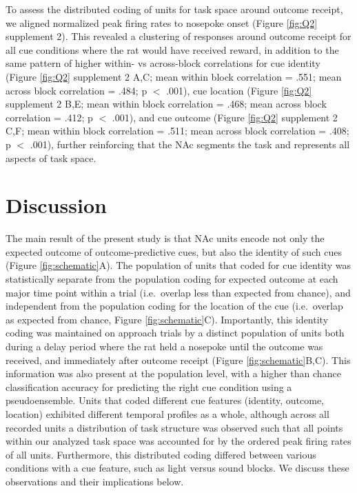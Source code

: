 \documentclass[11pt]{article}
\begin{document}
To assess the distributed coding of units for task space around outcome receipt, we aligned normalized peak firing rates to nosepoke onset (Figure \ref{fig:Q2} supplement 2). This revealed a clustering of responses around outcome receipt for all cue conditions where the rat would have received reward, in addition to the same pattern of higher within- vs across-block correlations for cue identity (Figure \ref{fig:Q2} supplement 2 A,C; mean within block correlation = .551; mean across block correlation = .484; p $<$ .001), cue location (Figure \ref{fig:Q2} supplement 2 B,E; mean within block correlation = .468; mean across block correlation = .412; p $<$ .001), and cue outcome (Figure \ref{fig:Q2} supplement 2 C,F; mean within block correlation = .511; mean across block correlation = .408; p $<$ .001), further reinforcing that the NAc segments the task and represents all aspects of task space.

\section*{Discussion}

The main result of the present study is that NAc units encode not only the expected outcome of outcome-predictive cues, but also the identity of such cues (Figure \ref{fig:schematic}A). The population of units that coded for cue identity was statistically separate from the population coding for expected outcome at each major time point within a trial (i.e.\ overlap less than expected from chance), and independent from the population coding for the location of the cue (i.e.\ overlap as expected from chance, Figure \ref{fig:schematic}C). Importantly, this identity coding was maintained on approach trials by a distinct population of units both during a delay period where the rat held a nosepoke until the outcome was received, and immediately after outcome receipt (Figure \ref{fig:schematic}B,C). This information was also present at the population level, with a higher than chance classification accuracy for predicting the right cue condition using a pseudoensemble. Units that coded different cue features (identity, outcome, location) exhibited different temporal profiles as a whole, although across all recorded units a distribution of task structure was observed such that all points within our analyzed task space was accounted for by the ordered peak firing rates of all units. Furthermore, this distributed coding differed between various conditions with a cue feature, such as light versus sound blocks. We discuss these observations and their implications below.
\end{document}
